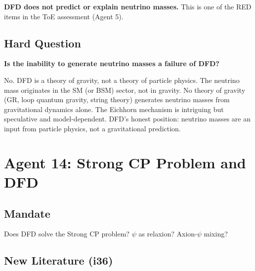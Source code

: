 \documentclass[11pt,a4paper]{article}
\begin{document}
\textbf{DFD does not predict or explain neutrino masses.} This is one of the RED items in the ToE assessment (Agent 5).

\subsection{Hard Question}

\textbf{Is the inability to generate neutrino masses a failure of DFD?}

No. DFD is a theory of gravity, not a theory of particle physics. The neutrino mass originates in the SM (or BSM) sector, not in gravity. No theory of gravity (GR, loop quantum gravity, string theory) generates neutrino masses from gravitational dynamics alone. The Eichhorn mechanism is intriguing but speculative and model-dependent. DFD's honest position: neutrino masses are an input from particle physics, not a gravitational prediction.

\newpage
\section{Agent 14: Strong CP Problem and DFD}
\label{sec:agent14}

\subsection{Mandate}

Does DFD solve the Strong CP problem? $\psi$ as relaxion? Axion-$\psi$ mixing?

\subsection{New Literature (i36)}
\end{document}
